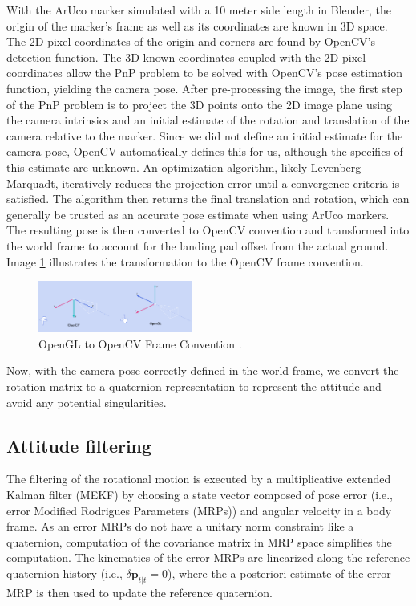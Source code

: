 \documentclass[conference]{IEEEtran}
\begin{document}
With the ArUco marker simulated with a 10 meter side length in Blender, the origin of the marker's frame as well as its coordinates are known in 3D space. 
The 2D pixel coordinates of the origin and corners are found by OpenCV's detection function. 
The 3D known coordinates coupled with the 2D pixel coordinates allow the PnP problem to be solved with OpenCV's pose estimation function, yielding the camera pose.
After pre-processing the image, the first step of the PnP problem is to project the 3D points onto the 2D image plane using the camera intrinsics and an initial estimate of the rotation and translation of the camera relative to the marker. 
Since we did not define an initial estimate for the camera pose, OpenCV automatically defines this for us, although the specifics of this estimate are unknown.
An optimization algorithm, likely Levenberg-Marquadt, iteratively reduces the projection error until a convergence criteria is satisfied. 
The algorithm then returns the final translation and rotation, which can generally be trusted as an accurate pose estimate when using ArUco markers. 
The resulting pose is then converted to OpenCV convention and transformed into the world frame to account for the landing pad offset from the actual ground.
Image \ref{fig:CV_convention} illustrates the transformation to the OpenCV frame convention.

\begin{figure}[ht!] 
    \centerline{\includegraphics[width=0.45\textwidth]{CVtoGL.png}}
    \caption{OpenGL to OpenCV Frame Convention \cite{openCV2024web}.}
    \label{fig:CV_convention}
\end{figure}

Now, with the camera pose correctly defined in the world frame, we convert the rotation matrix to a quaternion representation to represent the attitude and avoid any potential singularities. 


\subsection{Attitude filtering}

The filtering of the rotational motion is executed by a multiplicative extended Kalman filter (MEKF) \cite{markley2003mekf} by choosing a state vector composed of pose error (i.e., error Modified Rodrigues Parameters (MRPs)) and angular velocity in a body frame.
As an error MRPs do not have a unitary norm constraint like a quaternion, computation of the covariance matrix in MRP space simplifies the computation. 
The kinematics of the error MRPs are linearized along the reference quaternion history (i.e., $\delta \boldsymbol{p}_{t|t} = 0$), where the a posteriori estimate of the error MRP is then used to update the reference quaternion. 
\end{document}
